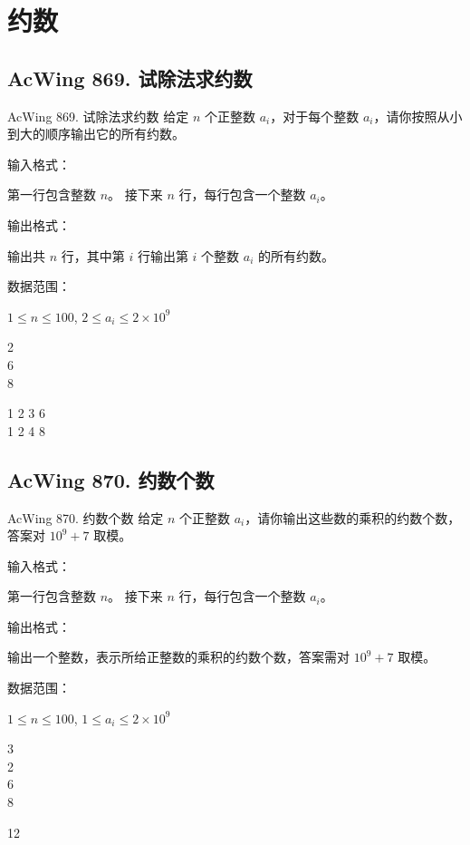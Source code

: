 \section{约数}

\subsection{AcWing 869. 试除法求约数}
\begin{titledbox}{AcWing 869. 试除法求约数}
    给定 $n$ 个正整数 $a_i$，对于每个整数 $a_i$，请你按照从小到大的顺序输出它的所有约数。

    输入格式：

    第一行包含整数 $n$。 接下来 $n$ 行，每行包含一个整数 $a_i$。

    输出格式：

    输出共 $n$ 行，其中第 $i$ 行输出第 $i$ 个整数 $a_i$ 的所有约数。

    数据范围：

    $1 \le n \le 100$, $2 \le a_i \le 2 \times 10^9$

    \begin{inputblock}
        2 \\
        6 \\
        8
    \end{inputblock}
    \begin{outputblock}
        1 2 3 6 \\
        1 2 4 8
    \end{outputblock}
\end{titledbox}

\subsection{AcWing 870. 约数个数}

\begin{titledbox}{AcWing 870. 约数个数}
    给定 $n$ 个正整数 $a_i$，请你输出这些数的乘积的约数个数，答案对 $10^9+7$ 取模。

    输入格式：

    第一行包含整数 $n$。 接下来 $n$ 行，每行包含一个整数 $a_i$。

    输出格式：

    输出一个整数，表示所给正整数的乘积的约数个数，答案需对 $10^9+7$ 取模。

    数据范围：

    $1 \le n \le 100$, $1 \le a_i \le 2 \times 10^9$

    \begin{inputblock}
        3 \\
        2 \\
        6 \\
        8
    \end{inputblock}
    \begin{outputblock}
        12
    \end{outputblock}
\end{titledbox}


